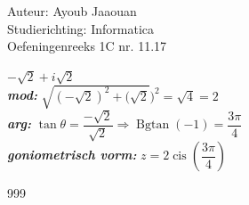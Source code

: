 \documentclass[a4paper]{article}
\begin{document}
  
\noindent \large Auteur: Ayoub Jaaouan          \\
\noindent \large Studierichting: Informatica   \\ 
\noindent \large Oefeningenreeks 1C nr. 11.17   \\

\medskip

\normalsize

$ -\sqrt{2} + i\sqrt{2} $\\

\textit {\textbf{mod:}}   $ \sqrt{(-\sqrt{2})^2+ (\sqrt{2}})^2 = \sqrt{4} = 2$ \\


\textit {\textbf{arg:}}   $ \tan\theta = \dfrac{-\sqrt{2}}{\sqrt{2}}  \Rightarrow \operatorname{Bgtan} \left(-1\right) = \dfrac{3\pi}{4}$ \\


\textit {\textbf{goniometrisch vorm:}} $ z = 2 \operatorname{cis}\left(\dfrac{3\pi}{4}\right)$\\



\begin{thebibliography}{999}
\end{thebibliography}
\end{document}
